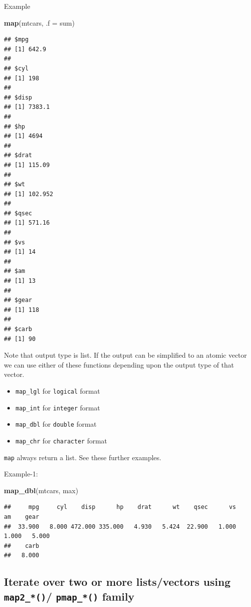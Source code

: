 \documentclass[
]{book}
\newenvironment{Shaded}{\begin{snugshade}}{\end{snugshade}}
\newcommand{\AttributeTok}[1]{\textcolor[rgb]{0.13,0.29,0.53}{#1}}
\newcommand{\FunctionTok}[1]{\textcolor[rgb]{0.13,0.29,0.53}{\textbf{#1}}}
\newcommand{\NormalTok}[1]{#1}
\providecommand{\tightlist}{%
  \setlength{\itemsep}{0pt}\setlength{\parskip}{0pt}}
\begin{document}
Example

\begin{Shaded}
\begin{Highlighting}[]
\FunctionTok{map}\NormalTok{(mtcars, }\AttributeTok{.f =}\NormalTok{ sum)}
\end{Highlighting}
\end{Shaded}

\begin{verbatim}
## $mpg
## [1] 642.9
## 
## $cyl
## [1] 198
## 
## $disp
## [1] 7383.1
## 
## $hp
## [1] 4694
## 
## $drat
## [1] 115.09
## 
## $wt
## [1] 102.952
## 
## $qsec
## [1] 571.16
## 
## $vs
## [1] 14
## 
## $am
## [1] 13
## 
## $gear
## [1] 118
## 
## $carb
## [1] 90
\end{verbatim}

Note that output type is list. If the output can be simplified to an atomic vector we can use either of these functions depending upon the output type of that vector.

\begin{itemize}
\tightlist
\item
  \texttt{map\_lgl} for \texttt{logical} format
\item
  \texttt{map\_int} for \texttt{integer} format
\item
  \texttt{map\_dbl} for \texttt{double} format
\item
  \texttt{map\_chr} for \texttt{character} format
\end{itemize}

\texttt{map} always return a list.
See these further examples.

Example-1:

\begin{Shaded}
\begin{Highlighting}[]
\FunctionTok{map\_dbl}\NormalTok{(mtcars, max)}
\end{Highlighting}
\end{Shaded}

\begin{verbatim}
##     mpg     cyl    disp      hp    drat      wt    qsec      vs      am    gear 
##  33.900   8.000 472.000 335.000   4.930   5.424  22.900   1.000   1.000   5.000 
##    carb 
##   8.000
\end{verbatim}

\hypertarget{iterate-over-two-or-more-listsvectors-using-map2_-pmap_-family}{%
\subsection{\texorpdfstring{Iterate over two or more lists/vectors using \texttt{map2\_*()}/ \texttt{pmap\_*()} family}{Iterate over two or more lists/vectors using map2\_*()/ pmap\_*() family}}\label{iterate-over-two-or-more-listsvectors-using-map2_-pmap_-family}}
\end{document}
